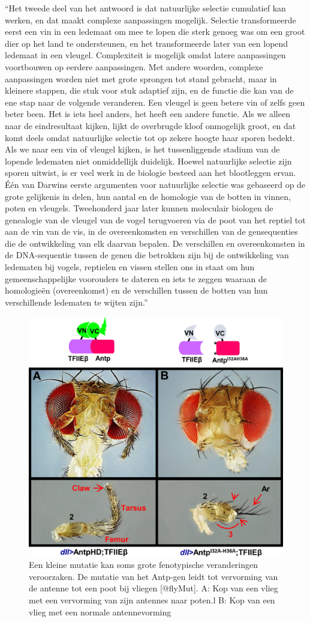 \documentclass[
  11pt,
]{book}
\begin{document}
``Het tweede deel van het antwoord is dat natuurlijke selectie cumulatief kan werken, en dat maakt complexe aanpassingen mogelijk. Selectie transformeerde eerst een vin in een ledemaat om mee te lopen die sterk genoeg was om een groot dier op het land te ondersteunen, en het transformeerde later van een lopend ledemaat in een vleugel. Complexiteit is mogelijk omdat latere aanpassingen voortbouwen op eerdere aanpassingen. Met andere woorden, complexe aanpassingen worden niet met grote sprongen tot stand gebracht, maar in kleinere stappen, die stuk voor stuk adaptief zijn, en de functie die kan van de ene stap naar de volgende veranderen. Een vleugel is geen betere vin of zelfs geen beter been. Het is iets heel anders, het heeft een andere functie. Als we alleen naar de eindresultaat kijken, lijkt de overbrugde kloof onmogelijk groot, en dat komt deels omdat natuurlijke selectie tot op zekere hoogte haar sporen bedekt. Als we naar een vin of vleugel kijken, is het tussenliggende stadium van de lopende ledematen niet onmiddellijk duidelijk. Hoewel natuurlijke selectie zijn sporen uitwist, is er veel werk in de biologie besteed aan het blootleggen ervan. Één van Darwins eerste argumenten voor natuurlijke selectie was gebaseerd op de grote gelijkenis in delen, hun aantal en de homologie van de botten in vinnen, poten en vleugels. Tweehonderd jaar later kunnen moleculair biologen de genealogie van de vleugel van de vogel terugvoeren via de poot van het reptiel tot aan de vin van de vis, in de overeenkomsten en verschillen van de gensequenties die de ontwikkeling van elk daarvan bepalen. De verschillen en overeenkomsten in de DNA-sequentie tussen de genen die betrokken zijn bij de ontwikkeling van ledematen bij vogels, reptielen en vissen stellen ons in staat om hun gemeenschappelijke voorouders te dateren en iets te zeggen waaraan de homologieën (overeenkomst) en de verschillen tussen de botten van hun verschillende ledematen te wijten zijn.''

\begin{figure}

{\centering \includegraphics[width=0.45\linewidth]{./figs/pone.0205905.g006_flyAntennaLegMutation2} 

}

\caption{Een kleine mutatie kan soms grote fenotypische veranderingen veroorzaken. De mutatie van het Antp-gen leidt tot vervorming van de antenne tot een poot bij vliegen [@flyMut]. A: Kop van een vlieg met een vervorming van zijn antennes naar poten.l B: Kop van een vlieg met een normale antennevorming}\label{fig:flyEye}
\end{figure}
\end{document}
